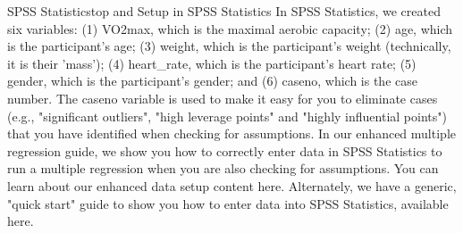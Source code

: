 \documentclass[]{article}
\begin{document}
	SPSS Statisticstop and
	Setup in SPSS Statistics
	In SPSS Statistics, we created six variables: (1) VO2max, which is the maximal aerobic capacity; (2) age, which is the participant's age; (3) weight, which is the participant's weight (technically, it is their 'mass'); (4) heart\_rate, which is the participant's heart rate; (5) gender, which is the participant's gender; and (6) caseno, which is the case number. The caseno variable is used to make it easy for you to eliminate cases (e.g., "significant outliers", "high leverage points" and "highly influential points") that you have identified when checking for assumptions. In our enhanced multiple regression guide, we show you how to correctly enter data in SPSS Statistics to run a multiple regression when you are also checking for assumptions. You can learn about our enhanced data setup content here. Alternately, we have a generic, "quick start" guide to show you how to enter data into SPSS Statistics, available here.
	
\end{document}
